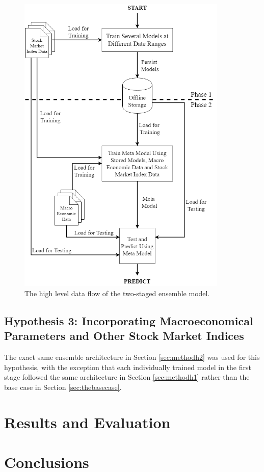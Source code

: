 \documentclass{UoYCSproject}
\begin{document}
\begin{figure}[h]
\includegraphics[width=10cm]{Meta-model.png}
\centering
\caption{The high level data flow of the two-staged ensemble model.} 
\label{fig:metamodelflow}
\end{figure}


\section{Hypothesis 3: Incorporating Macroeconomical Parameters and Other Stock Market Indices}
\label{sec:methodh3}
The exact same ensemble architecture in Section \ref{sec:methodh2} was used for this hypothesis, with the exception that each individually trained model in the first stage followed the same architecture in Section \ref{sec:methodh1} rather than the base case in Section \ref{sec:thebasecase}.

\chapter{Results and Evaluation}

\chapter{Conclusions}
\printbibliography
\end{document}
